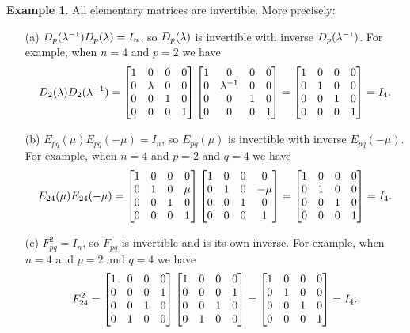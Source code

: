 \documentclass[reqno]{amsart}
\theoremstyle{definition}
\newtheorem{example}[theorem]{Example}
\begin{document}
\begin{example}\label{eg-elem-invertible}
 All elementary matrices are invertible.  More precisely:
 \begin{itemize}
  \item[(a)] $D_p(\lambda^{-1})D_p(\lambda)=I_n$, so $D_p(\lambda)$ is invertible
   with inverse $D_p(\lambda^{-1})$.  For example, when $n=4$ and $p=2$ we
   have 
   \[ 
    D_2(\lambda)D_2(\lambda^{-1}) = 
    \left[\begin{matrix} 1&0&0&0 \\ 0&\lambda&0&0 \\ 0&0&1&0 \\ 0&0&0&1 \end{matrix}\right]
    \left[\begin{matrix} 1&0&0&0 \\ 0&\lambda^{-1}&0&0 \\ 0&0&1&0 \\ 0&0&0&1 \end{matrix}\right]
    =
    \left[\begin{matrix} 1&0&0&0 \\ 0&1&0&0 \\ 0&0&1&0 \\ 0&0&0&1 \end{matrix}\right]
    = I_4.
   \] 
  \item[(b)] $E_{pq}(\mu)E_{pq}(-\mu)=I_n$, so $E_{pq}(\mu)$ is
   invertible with inverse $E_{pq}(-\mu)$.  For example, when $n=4$
   and $p=2$ and $q=4$ we have 
   \[ 
    E_{24}(\mu)E_{24}(-\mu) = 
    \left[\begin{matrix} 1&0&0&0 \\ 0&1&0&\mu \\ 0&0&1&0 \\ 0&0&0&1 \end{matrix}\right]
    \left[\begin{matrix} 1&0&0&0 \\ 0&1&0&-\mu \\ 0&0&1&0 \\ 0&0&0&1 \end{matrix}\right]
    =
    \left[\begin{matrix} 1&0&0&0 \\ 0&1&0&0 \\ 0&0&1&0 \\ 0&0&0&1 \end{matrix}\right]
    = I_4.
   \] 
  \item[(c)] $F_{pq}^2=I_n$, so $F_{pq}$ is invertible and is its own
   inverse.  For example, when $n=4$ and $p=2$ and $q=4$ we have 
   \[ 
    F_{24}^2 =
    \left[\begin{matrix} 1&0&0&0 \\ 0&0&0&1 \\ 0&0&1&0 \\ 0&1&0&0 \end{matrix}\right]
    \left[\begin{matrix} 1&0&0&0 \\ 0&0&0&1 \\ 0&0&1&0 \\ 0&1&0&0 \end{matrix}\right]
    =
    \left[\begin{matrix} 1&0&0&0 \\ 0&1&0&0 \\ 0&0&1&0 \\ 0&0&0&1 \end{matrix}\right]
    = I_4.
   \] 
 \end{itemize}
\end{example}
\end{document}
